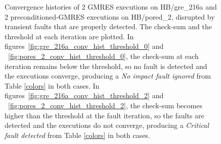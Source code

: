 \documentclass[twoside]{article}
\newcounter{fig}\setcounter{fig}{0}
\begin{document}
\begin{figure}[H]
\begin{minipage}[b]{0.48\linewidth}
      
    \end{minipage}
    \caption{Convergence histories of 2 GMRES executions on HB/gre_216a and 2 preconditioned-GMRES executions on HB/pored_2, disrupted by transient faults that are properly detected. The check-sum and the threshold at each iteration are plotted. In figures~\ref{fig:gre_216a_conv_hist_threshold_0} and ~\ref{fig:pores_2_conv_hist_threshold_0}, the check-sum at each iteration remains below the threshold, so no fault is detected and the executions converge, producing a \emph{No impact fault ignored} from Table \ref{colors} in both cases. In figures~\ref{fig:gre_216a_conv_hist_threshold_2} and ~\ref{fig:pores_2_conv_hist_threshold_2}, the check-sum becomes higher than the threshold at the fault iteration, so the faults are detected and the executions do not converge, producing a \emph{Critical fault detected} from Table \ref{colors} in both cases. }\label{fig:conv_hist_threshold}
  \end{figure}
\end{document}

